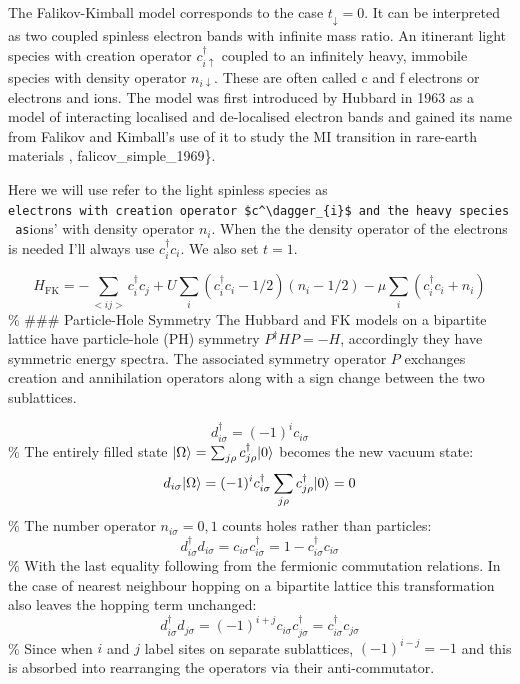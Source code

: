 The Falikov-Kimball model corresponds to the case \(t_{\downarrow} = 0\). It can be interpreted as two coupled spinless electron bands with infinite mass ratio. An itinerant light species with creation operator \(c^\dagger_{i\uparrow}\) coupled to an infinitely heavy, immobile species with density operator \(n_{i\downarrow}\). These are often called c and f electrons or electrons and ions. The model was first introduced by Hubbard in 1963 as a model of interacting localised and de-localised electron bands and gained its name from Falikov and Kimball's use of it to study the MI transition in rare-earth materials \textcite{hubbard_j._electron_1963}, falicov\_simple\_1969\}.

Here we will use refer to the light spinless species as \texttt{electrons\textquotesingle{}\ with\ creation\ operator\ \$c\^{}\textbackslash{}dagger\_\{i\}\$\ and\ the\ heavy\ species\ as}ions' with density operator \(n_i\). When the the density operator of the electrons is needed I'll always use \(c^\dagger_{i}c_{i}\). We also set \(t = 1\).

\[
    H_{\mathrm{FK}} = -\sum_{<ij>} c^\dagger_{i}c_{j} + U \sum_{i} (c^\dagger_{i}c_{i} - 1/2)( n_i - 1/2) - \mu \sum_i \left(c^\dagger_{i}c_{i} + n_{i}\right)
\] \% \#\#\# Particle-Hole Symmetry The Hubbard and FK models on a bipartite lattice have particle-hole (PH) symmetry \(P^\dagger H P = - H\), accordingly they have symmetric energy spectra. The associated symmetry operator \(P\) exchanges creation and annihilation operators along with a sign change between the two sublattices.

\[ d^\dagger_{i\sigma} = (-1)^i c_{i\sigma}\] \% The entirely filled state \(|\Omega\rangle = \sum_{j\rho} c^\dagger_{j\rho} |0\rangle\) becomes the new vacuum state: \[d_{i\sigma} |\Omega\rangle = (-1)^i c^\dagger_{i\sigma} \sum_{j\rho} c^\dagger_{j\rho} |0\rangle = 0\] \% The number operator \(n_{i\sigma} = 0,1\) counts holes rather than particles: \[ d^\dagger_{i\sigma} d_{i \sigma} = c_{i\sigma} c^\dagger_{i\sigma} = 1 - c^\dagger_{i\sigma} c_{i\sigma}\] \% With the last equality following from the fermionic commutation relations. In the case of nearest neighbour hopping on a bipartite lattice this transformation also leaves the hopping term unchanged: \[ d^\dagger_{i\sigma} d_{j \sigma} = (-1)^{i+j} c_{i\sigma} c^\dagger_{j\sigma} = c^\dagger_{i\sigma} c_{j\sigma} \] \% Since when \(i\) and \(j\) label sites on separate sublattices, \((-1)^{i-j} = -1\) and this is absorbed into rearranging the operators via their anti-commutator.

